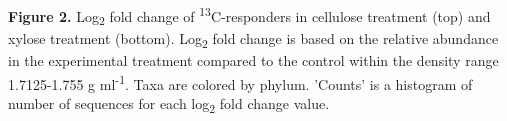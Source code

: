 \textbf{Figure 2.}  Log\textsubscript{2} fold change of \textsuperscript{13}C-responders in cellulose treatment (top) and xylose treatment (bottom).  Log\textsubscript{2} fold change is based on the relative abundance in the experimental treatment compared to the control within the density range 1.7125-1.755 g ml\textsuperscript{-1}. Taxa are colored by phylum. 'Counts' is a histogram of number of sequences for each log\textsubscript{2} fold change value.    
